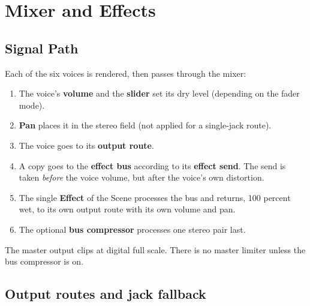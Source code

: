 \section{Mixer and Effects}\label{mixer-and-effects}

\subsection{Signal Path}\label{signal-path}


Each of the six voices is rendered, then passes through the mixer:

\begin{enumerate}
\def\labelenumi{\arabic{enumi}.}
\tightlist
\item
  The voice's \textbf{volume} and the \textbf{slider} set its dry level
  (depending on the fader mode).
\item
  \textbf{Pan} places it in the stereo field (not applied for a
  single-jack route).
\item
  The voice goes to its \textbf{output route}.
\item
  A copy goes to the \textbf{effect bus} according to its \textbf{effect
  send}. The send is taken \emph{before} the voice volume, but after the
  voice's own distortion.
\item
  The single \textbf{Effect} of the Scene processes the bus and returns,
  100 percent wet, to its own output route with its own volume and pan.
\item
  The optional \textbf{bus compressor} processes one stereo pair last.
\end{enumerate}

The master output clips at digital full scale. There is no master
limiter unless the bus compressor is on.

\subsection{Output routes and jack
fallback}\label{output-routes-and-jack-fallback}

